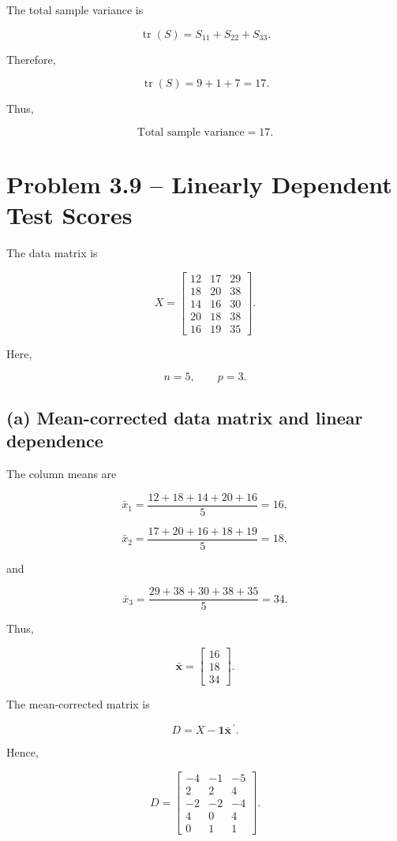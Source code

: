 \documentclass{article}
\begin{document}
The total sample variance is

\[
\operatorname{tr}(S)
=
S_{11}+S_{22}+S_{33}.
\]

Therefore,

\[
\operatorname{tr}(S)
=
9+1+7
=
\boxed{17}.
\]

Thus,

\[
\boxed{\text{Total sample variance}=17}.
\]


\section*{Problem 3.9 -- Linearly Dependent Test Scores}

The data matrix is

\[
X=
\begin{bmatrix}
12&17&29\\
18&20&38\\
14&16&30\\
20&18&38\\
16&19&35
\end{bmatrix}.
\]

Here,

\[
n=5,\qquad p=3.
\]

\subsection*{(a) Mean-corrected data matrix and linear dependence}

The column means are

\[
\bar{x}_1
=
\frac{12+18+14+20+16}{5}
=
16,
\]

\[
\bar{x}_2
=
\frac{17+20+16+18+19}{5}
=
18,
\]

and

\[
\bar{x}_3
=
\frac{29+38+30+38+35}{5}
=
34.
\]

Thus,

\[
\boxed{
\bar{\mathbf x}
=
\begin{bmatrix}
16\\18\\34
\end{bmatrix}}.
\]

The mean-corrected matrix is

\[
D=X-\mathbf1\bar{\mathbf x}^{\,\prime}.
\]

Hence,

\[
\boxed{
D=
\begin{bmatrix}
-4&-1&-5\\
2&2&4\\
-2&-2&-4\\
4&0&4\\
0&1&1
\end{bmatrix}}.
\]
\end{document}
